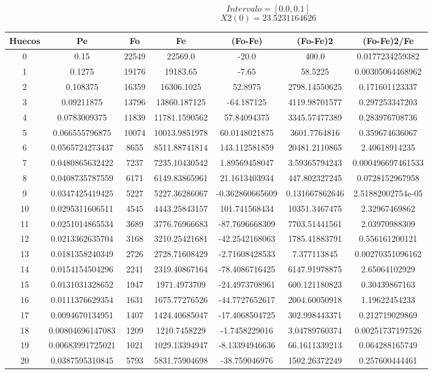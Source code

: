 \documentclass{article}
\begin{document}
$$
Intervalo = [0.0, 0.1]
$$
$$
X2(0) = 23.5231164626
$$
\begin{tabular}{|c|c|c|c|c|c|c|}
Huecos&Pe&Fo&Fe&(Fo{-}Fe)&(Fo{-}Fe)2&(Fo{-}Fe)2/Fe\\
\hline
0&0.15&22549&22569.0&{-}20.0&400.0&0.0177234259382\\
\hline
1&0.1275&19176&19183.65&{-}7.65&58.5225&0.00305064468962\\
\hline
2&0.108375&16359&16306.1025&52.8975&2798.14550625&0.171601123337\\
\hline
3&0.09211875&13796&13860.187125&{-}64.187125&4119.98701577&0.297253347203\\
\hline
4&0.0783009375&11839&11781.1590562&57.84094375&3345.57477389&0.283976708736\\
\hline
5&0.066555796875&10074&10013.9851978&60.0148021875&3601.7764816&0.359674636067\\
\hline
6&0.0565724273437&8655&8511.88741814&143.112581859&20481.2110865&2.40618914235\\
\hline
7&0.0480865632422&7237&7235.10430542&1.89569458047&3.59365794243&0.000496697461533\\
\hline
8&0.0408735787559&6171&6149.83865961&21.1613403934&447.802327245&0.0728152967958\\
\hline
9&0.0347425419425&5227&5227.36286067&{-}0.362860665609&0.131667862646&2.51882002754e{-}05\\
\hline
10&0.0295311606511&4545&4443.25843157&101.741568434&10351.3467475&2.32967469862\\
\hline
11&0.0251014865534&3689&3776.76966683&{-}87.7696668309&7703.51441561&2.03970988309\\
\hline
12&0.0213362635704&3168&3210.25421681&{-}42.2542168063&1785.41883791&0.556161200121\\
\hline
13&0.0181358240349&2726&2728.71608429&{-}2.71608428533&7.377113845&0.00270351096162\\
\hline
14&0.0154154504296&2241&2319.40867164&{-}78.4086716425&6147.91978875&2.65064102929\\
\hline
15&0.0131031328652&1947&1971.4973709&{-}24.4973708961&600.121180823&0.30439867163\\
\hline
16&0.0111376629354&1631&1675.77276526&{-}44.7727652617&2004.60050918&1.19622454233\\
\hline
17&0.0094670134951&1407&1424.40685047&{-}17.4068504725&302.998443371&0.212719029869\\
\hline
18&0.00804696147083&1209&1210.7458229&{-}1.7458229016&3.04789760374&0.00251737197526\\
\hline
19&0.00683991725021&1021&1029.13394947&{-}8.13394946636&66.1611339213&0.064288165749\\
\hline
20&0.0387595310845&5793&5831.75904698&{-}38.759046976&1502.26372249&0.257600444461\\
\end{tabular}
\end{document}
